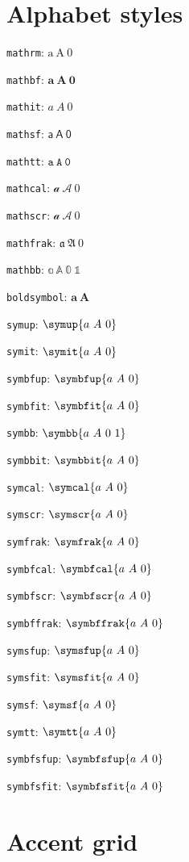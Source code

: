 \documentclass{article}
\begin{document}
\section*{Alphabet styles}

\texttt{mathrm}: $\mathrm{a\ A\ 0}$\par
\texttt{mathbf}: $\mathbf{a\ A\ 0}$\par
\texttt{mathit}: $\mathit{a\ A\ 0}$\par
\texttt{mathsf}: $\mathsf{a\ A\ 0}$\par
\texttt{mathtt}: $\mathtt{a\ A\ 0}$\par
\texttt{mathcal}: $\mathcal{a\ A\ 0}$\par
\texttt{mathscr}: $\mathscr{a\ A\ 0}$\par
\texttt{mathfrak}: $\mathfrak{a\ A\ 0}$\par
\texttt{mathbb}: $\mathbb{a\ A\ 0\ 1}$\par
\texttt{boldsymbol}: $\boldsymbol{a\ A}$\par
\texttt{symup}: $\symup{a\ A\ 0}$\par
\texttt{symit}: $\symit{a\ A\ 0}$\par
\texttt{symbfup}: $\symbfup{a\ A\ 0}$\par
\texttt{symbfit}: $\symbfit{a\ A\ 0}$\par
\texttt{symbb}: $\symbb{a\ A\ 0\ 1}$\par
\texttt{symbbit}: $\symbbit{a\ A\ 0}$\par
\texttt{symcal}: $\symcal{a\ A\ 0}$\par
\texttt{symscr}: $\symscr{a\ A\ 0}$\par
\texttt{symfrak}: $\symfrak{a\ A\ 0}$\par
\texttt{symbfcal}: $\symbfcal{a\ A\ 0}$\par
\texttt{symbfscr}: $\symbfscr{a\ A\ 0}$\par
\texttt{symbffrak}: $\symbffrak{a\ A\ 0}$\par
\texttt{symsfup}: $\symsfup{a\ A\ 0}$\par
\texttt{symsfit}: $\symsfit{a\ A\ 0}$\par
\texttt{symsf}: $\symsf{a\ A\ 0}$\par
\texttt{symtt}: $\symtt{a\ A\ 0}$\par
\texttt{symbfsfup}: $\symbfsfup{a\ A\ 0}$\par
\texttt{symbfsfit}: $\symbfsfit{a\ A\ 0}$\par

\section*{Accent grid}
\end{document}
